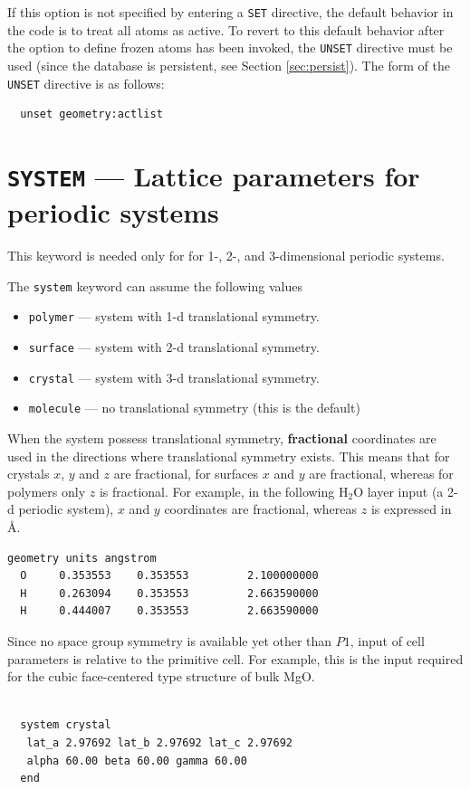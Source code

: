 If this option is not specified by entering a \verb+SET+ directive,
the default behavior in the code is to treat all atoms as active.  To
revert to this default behavior after the option to define frozen
atoms has been invoked, the \verb+UNSET+ directive must be used (since
the database is persistent, see Section \ref{sec:persist}).  The form
of the \verb+UNSET+ directive is as follows:
\begin{verbatim}
  unset geometry:actlist
\end{verbatim}

\section{{\tt SYSTEM} --- Lattice parameters for periodic systems}
\label{sec:latticeparam}

This keyword is needed only for for 1-, 2-, and 3-dimensional
periodic systems.

The {\tt system} keyword can assume the following values

\begin{itemize}
\item {\tt polymer} --- system with 1-d translational symmetry.
\item {\tt surface} --- system with 2-d translational symmetry.
\item {\tt crystal} --- system with 3-d translational symmetry. 
\item {\tt molecule} --- no translational symmetry (this is the default)
\end{itemize}   

When the system possess translational symmetry, {\bf fractional} coordinates
are used in the directions where translational symmetry exists. 
This means that for crystals $x$, $y$ and $z$ are fractional, for
surfaces $x$ and $y$  are fractional, whereas for polymers only $z$ is
fractional.
For example, in the following H$_2$O layer input (a 2-d  periodic
system), $x$ and $y$ coordinates are fractional, whereas $z$
is expressed in \AA .
\begin{verbatim}
geometry units angstrom
  O     0.353553    0.353553         2.100000000
  H     0.263094    0.353553         2.663590000
  H     0.444007    0.353553         2.663590000
\end{verbatim}

Since no space group symmetry is available yet other than $P1$, input
of cell parameters is relative to the primitive cell. For example,
this is the input  required for the cubic face-centered type structure
of bulk MgO.

\begin{verbatim}

  system crystal
   lat_a 2.97692 lat_b 2.97692 lat_c 2.97692 
   alpha 60.00 beta 60.00 gamma 60.00
  end
\end{verbatim}





